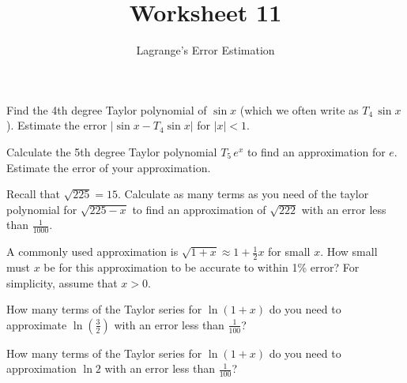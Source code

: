 \documentclass[paper=letter, 11pt]{article}
\title{Worksheet 11}
\subtitle{Lagrange's Error Estimation}
\begin{document}
\maketitle

\Prob Find the 4th degree Taylor polynomial of $\sin x$ (which we often write as $T_4\, \sin x$).  Estimate the error $|\sin x - T_4 \sin x|$ for $|x| < 1$.\vfill

\Prob Calculate the 5th degree Taylor polynomial $T_5\, e^x$ to find an approximation for $e$.  Estimate the error of your approximation.\vfill

\newpage

\Prob Recall that $\sqrt{225} = 15$.  Calculate as many terms as you need of the taylor polynomial for $\sqrt{225 - x}$ to find an approximation of $\sqrt{222}$ with an error less than $\frac{1}{1000}$.\vfill

\Prob A commonly used approximation is $\sqrt{1 + x} \approx 1 + \frac{1}{2}x$ for small $x$.  How small must $x$ be for this approximation to be accurate to within 1\% error?  For simplicity, assume that $x > 0$.\vfill

\newpage 

\Prob How many terms of the Taylor series for $\ln(1 + x)$ do you need to approximate $\ln\left(\frac{3}{2}\right)$ with an error less than $\frac{1}{100}$?\vfill

\Prob How many terms of the Taylor series for $\ln(1 + x)$ do you need to approximation $\ln 2$ with an error less than $\frac{1}{100}$?\vfill
\end{document}

